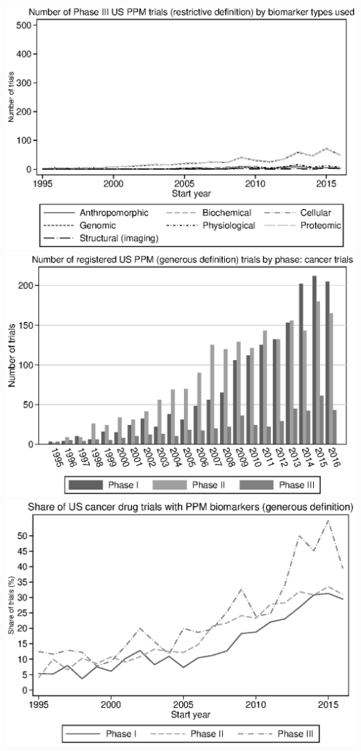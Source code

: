 \includegraphics{../figures/A04f-trial_count_by_type_r_ppm_phase_3_us.eps}
\includegraphics{../figures/A05a-g_ppm_count_by_phase_cancer_us.eps}
\includegraphics{../figures/A05b-g_ppm_share_by_phase_cancer_us.eps}
